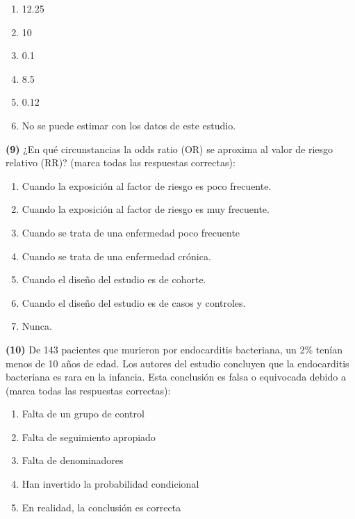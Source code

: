 \documentclass[
]{book}
\providecommand{\tightlist}{%
  \setlength{\itemsep}{0pt}\setlength{\parskip}{0pt}}
\theoremstyle{definition}
\theoremstyle{definition}
\theoremstyle{definition}
\theoremstyle{definition}
\theoremstyle{remark}
\begin{document}
\begin{enumerate}
\def\labelenumi{\arabic{enumi}.}
\tightlist
\item
  12.25
\item
  10\\
\item
  0.1\\
\item
  8.5\\
\item
  0.12
\item
  No se puede estimar con los datos de este estudio.
\end{enumerate}

\textbf{(9)} ¿En qué circunstancias la odds ratio (OR) se aproxima al valor de
riesgo relativo (RR)? (marca todas las respuestas correctas):

\begin{enumerate}
\def\labelenumi{\arabic{enumi}.}
\tightlist
\item
  Cuando la exposición al factor de riesgo es poco frecuente.
\item
  Cuando la exposición al factor de riesgo es muy frecuente.
\item
  Cuando se trata de una enfermedad poco frecuente
\item
  Cuando se trata de una enfermedad crónica.
\item
  Cuando el diseño del estudio es de cohorte.
\item
  Cuando el diseño del estudio es de casos y controles.
\item
  Nunca.
\end{enumerate}

\textbf{(10)} De 143 pacientes que murieron por endocarditis bacteriana, un 2\% tenían menos de 10 años de edad. Los autores del estudio concluyen que la endocarditis bacteriana es rara en la infancia. Esta conclusión es falsa o equivocada debido a (marca todas las respuestas correctas):

\begin{enumerate}
\def\labelenumi{\arabic{enumi}.}
\tightlist
\item
  Falta de un grupo de control\\
\item
  Falta de seguimiento apropiado
\item
  Falta de denominadores\\
\item
  Han invertido la probabilidad condicional\\
\item
  En realidad, la conclusión es correcta
\end{enumerate}
\end{document}

